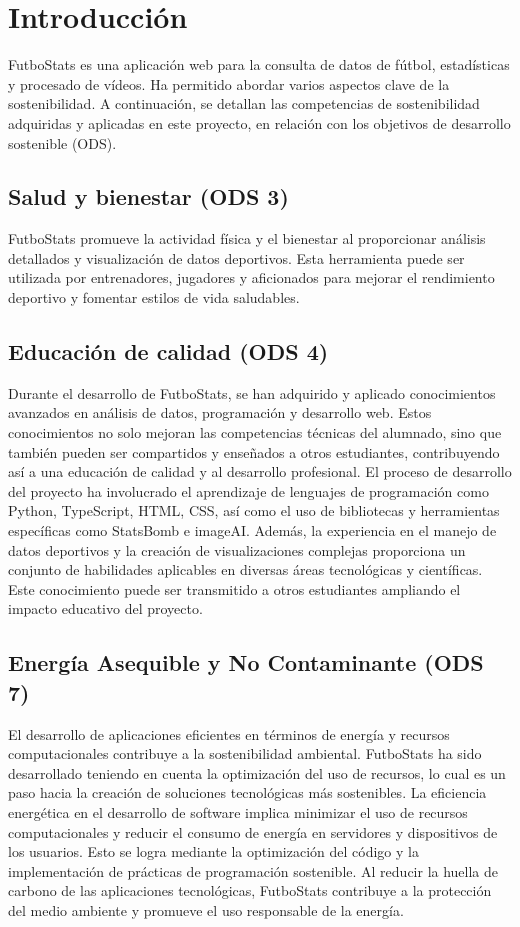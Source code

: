 
\section{Introducción}
FutboStats es una aplicación web para la consulta de datos de fútbol, estadísticas y procesado de vídeos. Ha permitido abordar varios aspectos clave de la sostenibilidad. A continuación, se detallan las competencias de sostenibilidad adquiridas y aplicadas en este proyecto, en relación con los objetivos de desarrollo sostenible (ODS).

\subsection{Salud y bienestar (ODS 3)}
FutboStats promueve la actividad física y el bienestar al proporcionar análisis detallados y visualización de datos deportivos. Esta herramienta puede ser utilizada por entrenadores, jugadores y aficionados para mejorar el rendimiento deportivo y fomentar estilos de vida saludables.

\subsection{Educación de calidad (ODS 4)}
Durante el desarrollo de FutboStats, se han adquirido y aplicado conocimientos avanzados en análisis de datos, programación y desarrollo web. Estos conocimientos no solo mejoran las competencias técnicas del alumnado, sino que también pueden ser compartidos y enseñados a otros estudiantes, contribuyendo así a una educación de calidad y al desarrollo profesional.
El proceso de desarrollo del proyecto ha involucrado el aprendizaje de lenguajes de programación como Python, TypeScript, HTML, CSS, así como el uso de bibliotecas y herramientas específicas como StatsBomb e imageAI. Además, la experiencia en el manejo de datos deportivos y la creación de visualizaciones complejas proporciona un conjunto de habilidades aplicables en diversas áreas tecnológicas y científicas. Este conocimiento puede ser transmitido a otros estudiantes ampliando el impacto educativo del proyecto.

\subsection{Energía Asequible y No Contaminante (ODS 7)}
El desarrollo de aplicaciones eficientes en términos de energía y recursos computacionales contribuye a la sostenibilidad ambiental. FutboStats ha sido desarrollado teniendo en cuenta la optimización del uso de recursos, lo cual es un paso hacia la creación de soluciones tecnológicas más sostenibles. La eficiencia energética en el desarrollo de software implica minimizar el uso de recursos computacionales y reducir el consumo de energía en servidores y dispositivos de los usuarios. Esto se logra mediante la optimización del código y la implementación de prácticas de programación sostenible. Al reducir la huella de carbono de las aplicaciones tecnológicas, FutboStats contribuye a la protección del medio ambiente y promueve el uso responsable de la energía.


